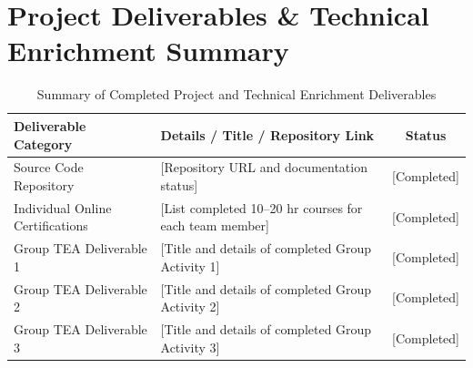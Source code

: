 \documentclass[11pt, a4paper]{article}
\begin{document}
\section{Project Deliverables \& Technical Enrichment Summary}
\begin{table}[H]
    \centering
    \footnotesize
    \renewcommand{\arraystretch}{1.2}
    \begin{tabular}{|p{4.2cm}|p{7.5cm}|c|}
        \hline
        \textbf{Deliverable Category} & \textbf{Details / Title / Repository Link} & \textbf{Status} \\
        \hline
        Source Code Repository & {[Repository URL and documentation status]} & {[Completed]} \\
        \hline
        Individual Online Certifications & {[List completed 10--20 hr courses for each team member]} & {[Completed]} \\
        \hline
        Group TEA Deliverable 1 & {[Title and details of completed Group Activity 1]} & {[Completed]} \\
        \hline
        Group TEA Deliverable 2 & {[Title and details of completed Group Activity 2]} & {[Completed]} \\
        \hline
        Group TEA Deliverable 3 & {[Title and details of completed Group Activity 3]} & {[Completed]} \\
        \hline
    \end{tabular}
    \caption{Summary of Completed Project and Technical Enrichment Deliverables}
\end{table}

\vspace{0.2cm}
\nocite{*}
\renewcommand{\refname}{\large\bfseries\color{amritaMaroon}References}


\end{document}
